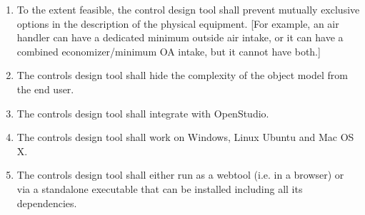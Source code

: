 \documentclass[letterpaper,10pt, openany,english]{sphinxmanual}
\begin{document}
\begin{enumerate}
\item {} 
To the extent feasible, the control design tool shall prevent mutually exclusive options in the description of the physical equipment.
{[}For example, an air handler can have a dedicated minimum outside air intake,
or it can have a combined economizer/minimum OA intake, but it cannot have both.{]}

\item {} 
The controls design tool shall hide the complexity of the object model from the end user.

\item {} 
The controls design tool shall integrate with OpenStudio.

\item {} 
The controls design tool shall work on Windows, Linux Ubuntu
and Mac OS X.

\item {} 
The controls design tool shall either run as a webtool (i.e. in a browser) or via a standalone executable that can be installed including all its dependencies.

\end{enumerate}
\end{document}
